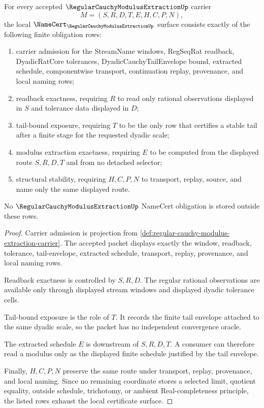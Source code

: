 \begin{theorem}
\label{thm:regular-cauchy-modulus-extraction-namecert-obligations}
For every accepted $\RegularCauchyModulusExtractionUp$ carrier
$$
M=(S,R,D,T,E,H,C,P,N),
$$
the local $\NameCert_{\RegularCauchyModulusExtractionUp}$ surface consists exactly of the following finite obligation rows:
\begin{enumerate}
\item carrier admission for the StreamName windows, RegSeqRat readback, DyadicRatCore tolerances, DyadicCauchyTailEnvelope bound, extracted schedule, componentwise transport, continuation replay, provenance, and local naming rows;
\item readback exactness, requiring $R$ to read only rational observations displayed in $S$ and tolerance data displayed in $D$;
\item tail-bound exposure, requiring $T$ to be the only row that certifies a stable tail after a finite stage for the requested dyadic scale;
\item modulus extraction exactness, requiring $E$ to be computed from the displayed route $S,R,D,T$ and from no detached selector;
\item structural stability, requiring $H,C,P,N$ to transport, replay, source, and name only the same displayed route.
\end{enumerate}
No $\RegularCauchyModulusExtractionUp$ NameCert obligation is stored outside these rows.
\end{theorem}
\begin{proof}
Carrier admission is projection from \autoref{def:regular-cauchy-modulus-extraction-carrier}. The accepted packet displays exactly the window, readback, tolerance, tail-envelope, extracted schedule, transport, replay, provenance, and local naming rows.

Readback exactness is controlled by $S,R,D$. The regular rational observations are available only through displayed stream windows and displayed dyadic tolerance cells.

Tail-bound exposure is the role of $T$. It records the finite tail envelope attached to the same dyadic scale, so the packet has no independent convergence oracle.

The extracted schedule $E$ is downstream of $S,R,D,T$. A consumer can therefore read a modulus only as the displayed finite schedule justified by the tail envelope.

Finally, $H,C,P,N$ preserve the same route under transport, replay, provenance, and local naming. Since no remaining coordinate stores a selected limit, quotient equality, outside schedule, trichotomy, or ambient Real-completeness principle, the listed rows exhaust the local certificate surface.
\end{proof}

